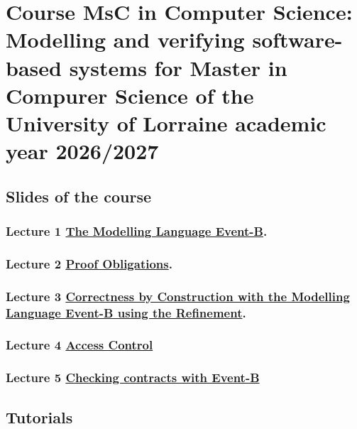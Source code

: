 \documentclass[ 12pt]{article}
\begin{document}
\section{Course  MsC in Computer Science:  Modelling and verifying software-based systems for
  Master in Compurer Science of the University of Lorraine academic year 2026/2027}
\label{sec:course-modell-verify}


\subsection{Slides of the course}
\label{sec:slides-course}

\subsubsection{Lecture 1 
  \href{http://mery54.github.io/teaching/mosos/lecturesnotes/mastercm1.pdf}{The 
    Modelling Language Event-B}.}

  
\subsubsection{ Lecture 2 
    \href{http://mery54.github.io/teaching/mosos/lecturesnotes/mastercm2.pdf}{Proof        Obligations}.}

\subsubsection{Lecture 3 
    \href{http://mery54.github.io/teaching/mosos/lecturesnotes/mastercm3.pdf}{Correctness by Construction with the  
      Modelling Language Event-B using the Refinement}.}

  \subsubsection{ Lecture 4 
    \href{http://mery54.github.io/teaching/mosos/lecturesnotes/mastercm4.pdf}{Access 
      Control }}


\subsubsection{ Lecture 5
    \href{http://mery54.github.io/teaching/mosos/lecturesnotes/mastercm5.pdf}{Checking contracts with Event-B}}

      
  
\subsection{Tutorials}
\end{document}
